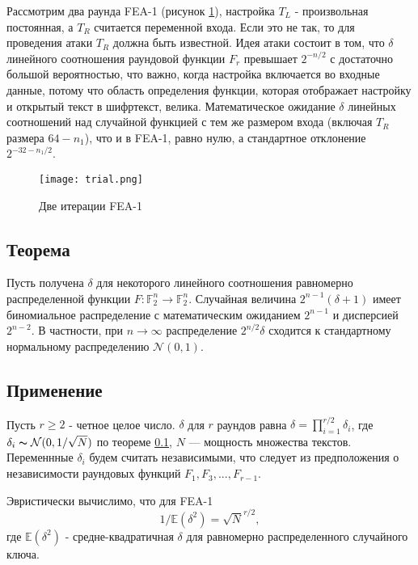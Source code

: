 \documentclass[utf8x, 14pt]{G7-32} %
\begin{document}
Рассмотрим два раунда FEA-1 (рисунок \ref{fig:trial}), настройка $T_L$ - произвольная постоянная, а $T_R$ считается переменной входа. Если это не так, то для проведения атаки $T_R$ должна быть известной. Идея атаки состоит в том, что $\delta$  линейного соотношения раундовой функции $F_r$ превышает $ 2^{-n/2}$ с достаточно большой вероятностью, что важно, когда настройка включается во входные данные, потому что область определения функции, которая отображает настройку и открытый текст в шифртекст, велика. Математическое ожидание $\delta$ линейных соотношений над случайной функцией с тем же размером входа (включая $T_R$ размера $64-n_1$), что и в FEA-1, равно нулю, а стандартное отклонение $2^{-32-n_1/2}$. 

\begin{figure}[h!]
	\centering
	\texttt{[image: trial.png]}
	\caption{Две итерации FEA-1}
	\label{fig:trial}
\end{figure}

\subsection{Теорема}\label{theorem}

 Пусть получена $\delta$ для некоторого линейного соотношения равномерно распределенной функции $F: \mathbb{F}_2^n \to \mathbb{F}_2^n$. Случайная величина $2^{n-1}(\delta+1)$ имеет биномиальное распределение с математическим ожиданием $2^{n-1}$ и дисперсией $2^{n-2}$. В частности, при $n\to\infty$ распределение $2^{n/2}\delta$ сходится к стандартному нормальному распределению $\mathcal{N}(0,1)$.

\subsection{Применение}

Пусть $r\geq 2$ - четное целое число. $\delta$ для $r$ раундов равна $\delta=\prod_{i=1}^{r/2} \delta_i$, где $\delta_i \thicksim \mathcal{N}(0,1/\sqrt{N})$ по теореме \ref{theorem}, $N$ --- мощность множества текстов. Переменнные $\delta_i$ будем считать независимыми, что следует из предположения о независимости раундовых функций $F_1, F_3, ..., F_{r-1}$.

Эвристически вычислимо, что для FEA-1
\begin{equation}
\label{eqn:keyeq}
1/\mathbb{E}(\delta^2)=\sqrt{N}^{r/2},\end{equation} 
где $\mathbb{E}(\delta^2)$ - средне-квадратичная $\delta$ для равномерно распределенного случайного ключа.
\end{document}

